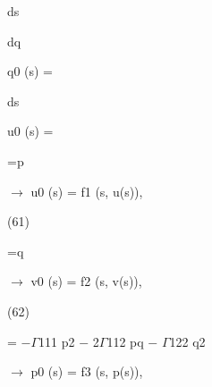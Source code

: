 \documentclass[a4paper,portrait,12pt]{article}
\begin{document}
\begin{flushleft}
ds
\end{flushleft}


\begin{flushleft}
dq
\end{flushleft}


\begin{flushleft}
q0 (s) =
\end{flushleft}


\begin{flushleft}
ds
\end{flushleft}





\begin{flushleft}
u0 (s) =
\end{flushleft}





\begin{flushleft}
=p
\end{flushleft}





\begin{flushleft}
$\rightarrow$ u0 (s) = f1 (s, u(s)),
\end{flushleft}





(61)





\begin{flushleft}
=q
\end{flushleft}





\begin{flushleft}
$\rightarrow$ v0 (s) = f2 (s, v(s)),
\end{flushleft}





(62)





\begin{flushleft}
= $-$$\Gamma$111 p2 $-$ 2$\Gamma$112 pq $-$ $\Gamma$122 q2
\end{flushleft}





\begin{flushleft}
$\rightarrow$ p0 (s) = f3 (s, p(s)),
\end{flushleft}
\end{document}
